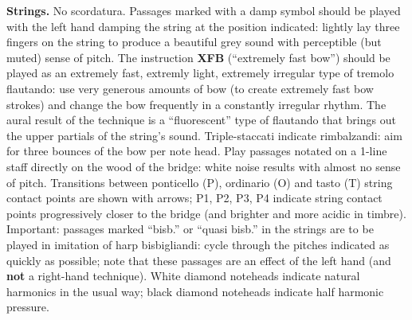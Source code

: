 \textbf{Strings.} No scordatura. Passages marked with a damp symbol should be
played with the left hand damping the string at the position indicated: lightly
lay three fingers on the string to produce a beautiful grey sound with
perceptible (but muted) sense of pitch. The instruction \textbf{XFB}
(``extremely fast bow'') should be played as an extremely fast, extremly light,
extremely irregular type of tremolo flautando: use very generous amounts of bow
(to create extremely fast bow strokes) and change the bow frequently in a
constantly irregular rhythm. The aural result of the technique is a
``fluorescent'' type of flautando that brings out the upper partials of the
string's sound. Triple-staccati indicate rimbalzandi: aim for three bounces of
the bow per note head. Play passages notated on a 1-line staff directly on the
wood of the bridge: white noise results with almost no sense of pitch.
Transitions between ponticello (P), ordinario (O) and tasto (T) string contact
points are shown with arrows; P1, P2, P3, P4 indicate string contact points
progressively closer to the bridge (and brighter and more acidic in timbre).
Important: passages marked ``bisb.'' or ``quasi bisb.'' in the strings are to
be played in imitation of harp bisbigliandi: cycle through the pitches
indicated as quickly as possible; note that these passages are an effect of the
left hand (and \textbf{not} a right-hand technique). White diamond noteheads
indicate natural harmonics in the usual way; black diamond noteheads
indicate half harmonic pressure.
